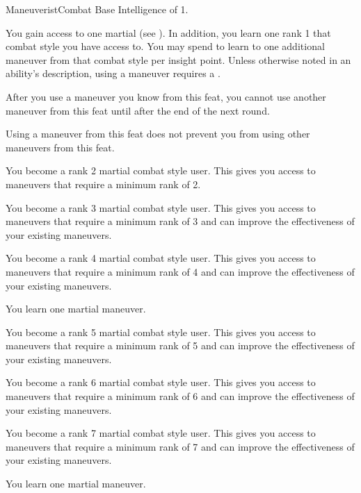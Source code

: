     \begin{feat}{Maneuverist}{Combat}
        \featpre Base Intelligence of 1.

         You gain access to one martial  (see ).
        In addition, you learn one rank 1  that combat style you have access to.
        You may spend  to learn to one additional maneuver from that combat style per insight point.
        Unless otherwise noted in an ability's description, using a maneuver requires a .

        After you use a maneuver you know from this feat, you cannot use another maneuver from this feat until after the end of the next round.

         Using a maneuver from this feat does not prevent you from using other maneuvers from this feat.

         You become a rank 2 martial combat style user.
        This gives you access to maneuvers that require a minimum rank of 2.

         You become a rank 3 martial combat style user.
        This gives you access to maneuvers that require a minimum rank of 3 and can improve the effectiveness of your existing maneuvers.

         You become a rank 4 martial combat style user.
        This gives you access to maneuvers that require a minimum rank of 4 and can improve the effectiveness of your existing maneuvers.

         You learn one martial maneuver.

         You become a rank 5 martial combat style user.
        This gives you access to maneuvers that require a minimum rank of 5 and can improve the effectiveness of your existing maneuvers.

         You become a rank 6 martial combat style user.
        This gives you access to maneuvers that require a minimum rank of 6 and can improve the effectiveness of your existing maneuvers.

         You become a rank 7 martial combat style user.
        This gives you access to maneuvers that require a minimum rank of 7 and can improve the effectiveness of your existing maneuvers.

         You learn one martial maneuver.
    \end{feat}


